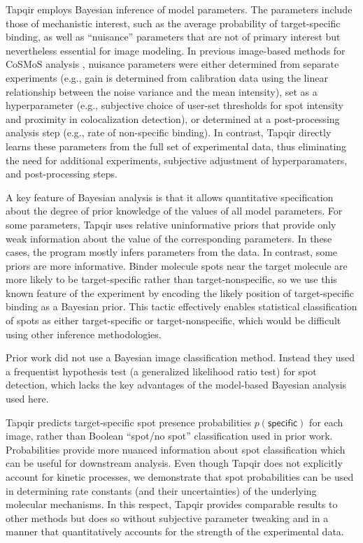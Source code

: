 Tapqir employs Bayesian inference of model parameters. The parameters include those of mechanistic interest, such as the average probability of target-specific binding, as well as ``nuisance'' parameters that are not of primary interest but nevertheless essential for image modeling. In previous image-based methods for CoSMoS analysis  \cite{Friedman2015-nx,Smith2019-yb}, nuisance parameters were either determined from separate experiments (e.g., gain is determined from calibration data using the linear relationship between the noise variance and the mean intensity), set as a hyperparameter (e.g., subjective choice of user-set thresholds for spot intensity and proximity in colocalization detection), or determined at a post-processing analysis step (e.g., rate of non-specific binding). In contrast, Tapqir directly learns these parameters from the full set of experimental data, thus eliminating the need for additional experiments, subjective adjustment of hyperparamaters, and post-processing steps.

A key feature of Bayesian analysis is that it allows quantitative specification about the degree of prior knowledge of the values of all model parameters. For some parameters, Tapqir uses relative uninformative priors that provide only weak information about the value of the corresponding parameters.  In these cases, the program mostly infers parameters from the data.  In contrast, some priors are more informative.  Binder molecule spots near the target molecule are more likely to be target-specific rather than target-nonspecific, so we use this known feature of the experiment by encoding the likely position of target-specific binding as a Bayesian prior. This tactic effectively enables statistical classification of spots as either target-specific or target-nonspecific, which would be difficult using other inference methodologies.

Prior work \cite{Smith2019-yb,Smith2015-gf} did not use a Bayesian image classification method.  Instead they used a frequentist hypothesis test (a generalized likelihood ratio test) for spot detection, which lacks the key advantages of the model-based Bayesian analysis used here.

Tapqir predicts target-specific spot presence probabilities $p(\mathsf{specific})$ for each image, rather than Boolean ``spot/no spot'' classification used in prior work. Probabilities provide more nuanced information about spot classification which can be useful for downstream analysis. Even though Tapqir does not explicitly account for kinetic processes, we demonstrate that spot probabilities can be used in determining rate constants (and their uncertainties) of the underlying molecular mechanisms. In this respect, Tapqir provides comparable results to other methods but does so without subjective parameter tweaking and in a manner that quantitatively accounts for the strength of the experimental data.

